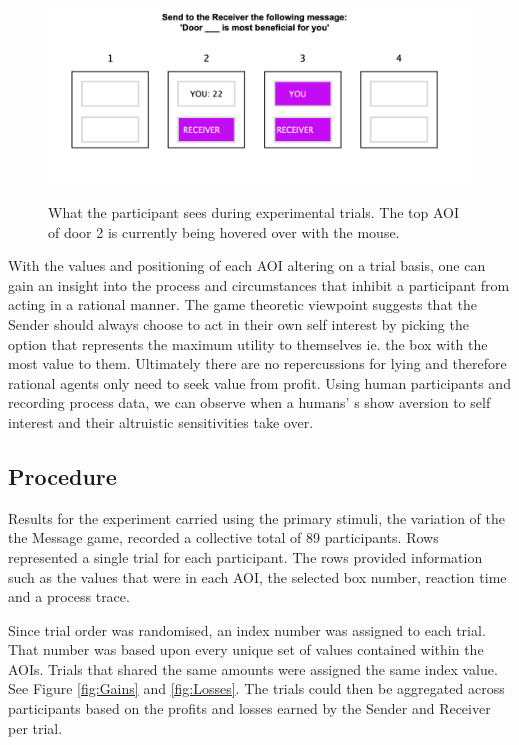 \documentclass[man, floatsintext]{apa7}
\begin{document}
\begin{figure}[H]
	\centering
	\includegraphics[width=0.75\linewidth]{figures/HIDDEN.png}
	\label{fig:HiddenAOIs}
	\caption{What the participant sees during experimental trials. The top AOI of door 2 is currently being hovered over with the mouse.}
\end{figure}

With the values and positioning of each AOI altering on a trial basis, one can gain an insight into the process and circumstances that inhibit a participant from acting in a rational manner. The game theoretic viewpoint suggests that the Sender should always choose to act in their own self interest by picking the option that represents the maximum utility to themselves ie. the box with the most value to them. Ultimately there are no repercussions for lying and therefore rational agents only need to seek value from profit. Using human participants and recording process data, we can observe when a humans' s show aversion to self interest and their altruistic sensitivities take over.

\subsection{Procedure}

Results for the experiment carried using the primary stimuli, the variation of the the Message game, recorded a collective total of 89 participants. Rows represented a single trial for each participant. The rows provided information such as the values that were in each AOI, the selected box number, reaction time and a process trace.

Since trial order was randomised, an index number was assigned to each trial. That number was based upon every unique set of values contained within the AOIs. Trials that shared the same amounts were assigned the same index value. See Figure \ref{fig:Gains} and \ref{fig:Losses}. The trials could then be aggregated across participants based on the profits and losses earned by the Sender and Receiver per trial.
\end{document}
